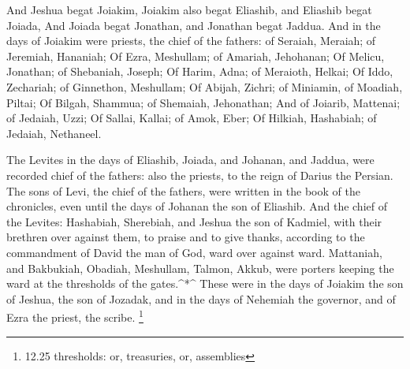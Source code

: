  And Jeshua begat Joiakim, Joiakim also begat Eliashib, and
Eliashib begat Joiada,  And Joiada begat Jonathan, and
Jonathan begat Jaddua.  And in the days of Joiakim were
priests, the chief of the fathers: of Seraiah, Meraiah; of Jeremiah,
Hananiah;  Of Ezra, Meshullam; of Amariah, Jehohanan;
 Of Melicu, Jonathan; of Shebaniah, Joseph; 
Of Harim, Adna; of Meraioth, Helkai;  Of Iddo, Zechariah;
of Ginnethon, Meshullam;  Of Abijah, Zichri; of Miniamin,
of Moadiah, Piltai;  Of Bilgah, Shammua; of Shemaiah,
Jehonathan;  And of Joiarib, Mattenai; of Jedaiah, Uzzi;
 Of Sallai, Kallai; of Amok, Eber;  Of
Hilkiah, Hashabiah; of Jedaiah, Nethaneel.

 The Levites in the days of Eliashib, Joiada, and Johanan,
and Jaddua, were recorded chief of the fathers: also the priests, to the
reign of Darius the Persian.  The sons of Levi, the chief
of the fathers, were written in the book of the chronicles, even until
the days of Johanan the son of Eliashib.  And the chief of
the Levites: Hashabiah, Sherebiah, and Jeshua the son of Kadmiel, with
their brethren over against them, to praise and to give thanks,
according to the commandment of David the man of God, ward over against
ward.  Mattaniah, and Bakbukiah, Obadiah, Meshullam,
Talmon, Akkub, were porters keeping the ward at the thresholds of the
gates.\^{}*\^{}  These were in the days of Joiakim the son
of Jeshua, the son of Jozadak, and in the days of Nehemiah the governor,
and of Ezra the priest, the scribe. \footnote{12.25 thresholds: or,
  treasuries, or, assemblies}

